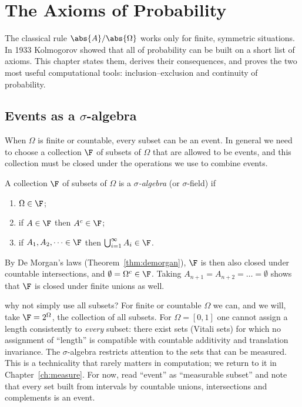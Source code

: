 \chapter{The Axioms of Probability}
\label{ch:axioms}

The classical rule $\abs{A}/\abs{\Omega}$ works only for finite, symmetric
situations. In 1933 Kolmogorov showed that all of probability can be built on a
short list of axioms. This chapter states them, derives their consequences, and
proves the two most useful computational tools: inclusion--exclusion and
continuity of probability.

\section{Events as a $\sigma$-algebra}

When $\Omega$ is finite or countable, every subset can be an event. In general
we need to choose a collection $\F$ of subsets of $\Omega$ that are allowed to
be events, and this collection must be closed under the operations we use to
combine events.

\begin{definition}
A collection $\F$ of subsets of $\Omega$ is a \emph{$\sigma$-algebra} (or
$\sigma$-field) if
\begin{enumerate}[label=(\roman*)]
\item $\Omega\in\F$;
\item if $A\in\F$ then $A^c\in\F$;
\item if $A_1,A_2,\dots\in\F$ then $\bigcup_{i=1}^\infty A_i\in\F$.
\end{enumerate}
\end{definition}

By De Morgan's laws (Theorem~\ref{thm:demorgan}), $\F$ is then also closed under
countable intersections, and $\emptyset=\Omega^c\in\F$. Taking
$A_{n+1}=A_{n+2}=\dots=\emptyset$ shows that $\F$ is closed under finite unions
as well.

\begin{nuance}{why not simply use all subsets?}
For finite or countable $\Omega$ we can, and we will, take $\F=2^\Omega$, the
collection of all subsets. For $\Omega=[0,1]$ one cannot assign a length
consistently to \emph{every} subset: there exist sets (Vitali sets) for which
no assignment of ``length'' is compatible with countable additivity and
translation invariance. The $\sigma$-algebra restricts attention to the sets
that can be measured. This is a technicality that rarely matters in computation;
we return to it in Chapter~\ref{ch:measure}. For now, read ``event'' as ``measurable subset''
and note that every set built from intervals by countable unions,
intersections and complements is an event.
\end{nuance}

